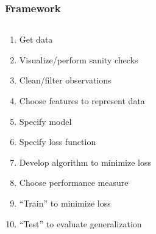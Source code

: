 \begin{frame}
  \frametitle{Framework}

  \begin{columns}
    \begin{column}{0.6\textwidth}
      
  \begin{enumerate}
    \item<1-> Get data
    \item<2-> Visualize/perform sanity checks
    \item<2-> Clean/filter observations
    \item<2-> Choose features to represent data
    \item<3-> Specify model
    \item<3-> Specify loss function 
    \item<4-> Develop algorithm to minimize loss 
    \item<5-> Choose performance measure
    \item<5-> ``Train'' to minimize loss
    \item<5-> ``Test'' to evaluate generalization
  \end{enumerate}

    \end{column}
    \begin{column}{0.3\textwidth}


\end{column}
\end{columns}
\end{frame}
